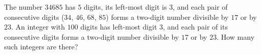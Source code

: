 The number $34685$ has $5$ digits, its left-most digit is $3$, and each pair of consecutive digits ($34$, $46$, $68$, $85$) forms a two-digit number divisible by $17$ or by $23$. An integer with $100$ digits has left-most digit $3$, and each pair of its consecutive digits forms a two-digit number divisible by $17$ or by $23$. How many such integers are there?
